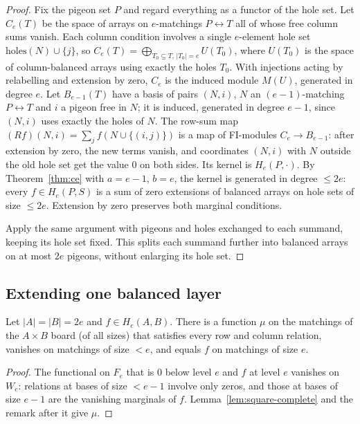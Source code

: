 \begin{proof}
Fix the pigeon set $P$ and regard everything as a functor of the hole set.  Let $C_e(T)$ be
the space of arrays on $e$-matchings $P\leftrightarrow T$ all of whose free column sums
vanish.  Each column condition involves a single $e$-element hole set
$\mathrm{holes}(N)\cup\{j\}$, so
$C_e(T)=\bigoplus_{T_0\subseteq T,\,|T_0|=e}U(T_0)$, where $U(T_0)$ is the space of
column-balanced arrays using exactly the holes $T_0$.  With injections acting by
relabelling and extension by zero, $C_e$ is the induced module $M(U)$, generated in degree
$e$.  Let $B_{e-1}(T)$ have a basis of pairs $(N,i)$, $N$ an $(e-1)$-matching
$P\leftrightarrow T$ and $i$ a pigeon free in $N$; it is induced, generated in degree
$e-1$, since $(N,i)$ uses exactly the holes of $N$.  The row-sum map
$(Rf)(N,i)=\sum_{j}f(N\cup\{(i,j)\})$ is a map of FI-modules $C_e\to B_{e-1}$: after
extension by zero, the new terms vanish, and coordinates $(N,i)$ with $N$ outside the old
hole set get the value $0$ on both sides.  Its kernel is $H_e(P,\cdot)$.  By
Theorem~\ref{thm:ce} with $a=e-1$, $b=e$, the kernel is generated in degree
$\le 2e$: every $f\in H_e(P,S)$ is a sum of zero extensions of balanced arrays on hole sets
of size $\le2e$.  Extension by zero preserves both marginal conditions.

Apply the same argument with pigeons and holes exchanged to each summand, keeping its hole
set fixed.  This splits each summand further into balanced arrays on at most $2e$ pigeons,
without enlarging its hole set.
\end{proof}

\subsection{Extending one balanced layer}\label{sec:growth-tensor}

\begin{lemma}\label{lem:square-real}
Let $|A|=|B|=2e$ and $f\in H_e(A,B)$.  There is a function $\mu$ on the matchings of the
$A\times B$ board (of all sizes) that satisfies every row and column relation, vanishes on
matchings of size $<e$, and equals $f$ on matchings of size $e$.
\end{lemma}

\begin{proof}
The functional on $F_e$ that is $0$ below level $e$ and $f$ at level $e$ vanishes on $W_e$:
relations at bases of size $<e-1$ involve only zeros, and those at bases of size $e-1$ are
the vanishing marginals of $f$.  Lemma~\ref{lem:square-complete} and the remark after it
give $\mu$.
\end{proof}

